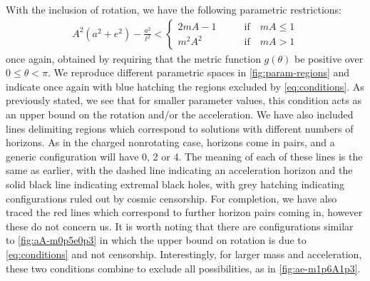 \documentclass[
twoside,
openright,
frontopenright,
]{dmathesis}
\begin{document}
With the inclusion of rotation, we have the following parametric restrictions:
\begin{align}
  \label{eq:conditions}
  A^2(a^2+e^2)-\frac{a^2}{\ell^2} <
  \begin{cases}
    2mA - 1 \qquad &\mbox{if} \quad mA \leqslant 1\\
    m^2A^2 \qquad &\mbox{if} \quad mA > 1
  \end{cases}
\end{align}
once again, obtained by requiring that the metric function $g(\theta)$ be
positive over $0\leqslant\theta<\pi$. We reproduce different parametric spaces
in \cref{fig:param-regions} and indicate once again with blue hatching the
regions excluded by \cref{eq:conditions}. As previously stated, we see that for
smaller parameter values, this condition acts as an upper bound on the rotation
and/or the acceleration. We have also included lines delimiting regions which
correspond to solutions with different numbers of horizons. As in the charged
nonrotating case, horizons come in pairs, and a generic configuration will have
0, 2 or 4. The meaning of each of these lines is the same as earlier, with the
dashed line indicating an acceleration horizon and the solid black line
indicating extremal black holes, with grey hatching indicating configurations
ruled out by cosmic censorship. For completion, we have also traced the red
lines which correspond to further horizon pairs coming in, however these do not
concern us. It is worth noting that there are configurations similar to
\cref{fig:aA-m0p5e0p3} in which the upper bound on rotation is due to
\cref{eq:conditions} and not censorship. Interestingly, for larger mass and
acceleration, these two conditions combine to exclude all possibilities, as in
\cref{fig:ae-m1p6A1p3}. 
\end{document}
